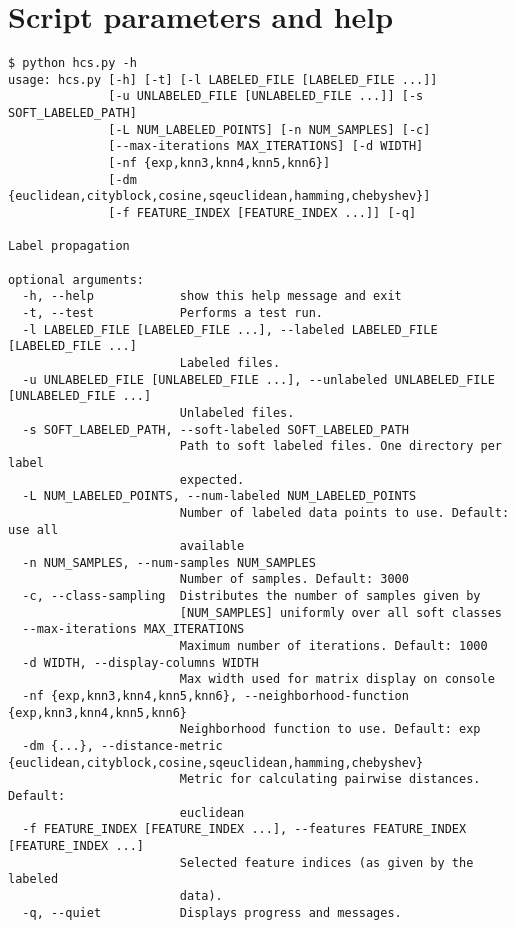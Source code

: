 \documentclass[oneside, a4paper, draft]{memoir} %
\begin{document}
\chapter{Script parameters and help}\label{app:codehelp}
\small
{}
\begin{verbatim}
$ python hcs.py -h
usage: hcs.py [-h] [-t] [-l LABELED_FILE [LABELED_FILE ...]]
              [-u UNLABELED_FILE [UNLABELED_FILE ...]] [-s SOFT_LABELED_PATH]
              [-L NUM_LABELED_POINTS] [-n NUM_SAMPLES] [-c]
              [--max-iterations MAX_ITERATIONS] [-d WIDTH]
              [-nf {exp,knn3,knn4,knn5,knn6}]
              [-dm {euclidean,cityblock,cosine,sqeuclidean,hamming,chebyshev}]
              [-f FEATURE_INDEX [FEATURE_INDEX ...]] [-q]

Label propagation

optional arguments:
  -h, --help            show this help message and exit
  -t, --test            Performs a test run.
  -l LABELED_FILE [LABELED_FILE ...], --labeled LABELED_FILE [LABELED_FILE ...]
                        Labeled files.
  -u UNLABELED_FILE [UNLABELED_FILE ...], --unlabeled UNLABELED_FILE [UNLABELED_FILE ...]
                        Unlabeled files.
  -s SOFT_LABELED_PATH, --soft-labeled SOFT_LABELED_PATH
                        Path to soft labeled files. One directory per label
                        expected.
  -L NUM_LABELED_POINTS, --num-labeled NUM_LABELED_POINTS
                        Number of labeled data points to use. Default: use all
                        available
  -n NUM_SAMPLES, --num-samples NUM_SAMPLES
                        Number of samples. Default: 3000
  -c, --class-sampling  Distributes the number of samples given by
                        [NUM_SAMPLES] uniformly over all soft classes
  --max-iterations MAX_ITERATIONS
                        Maximum number of iterations. Default: 1000
  -d WIDTH, --display-columns WIDTH
                        Max width used for matrix display on console
  -nf {exp,knn3,knn4,knn5,knn6}, --neighborhood-function {exp,knn3,knn4,knn5,knn6}
                        Neighborhood function to use. Default: exp
  -dm {...}, --distance-metric {euclidean,cityblock,cosine,sqeuclidean,hamming,chebyshev}
                        Metric for calculating pairwise distances. Default:
                        euclidean
  -f FEATURE_INDEX [FEATURE_INDEX ...], --features FEATURE_INDEX [FEATURE_INDEX ...]
                        Selected feature indices (as given by the labeled
                        data).
  -q, --quiet           Displays progress and messages.
\end{verbatim}
\end{document}
